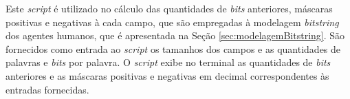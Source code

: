 Este \textit{script} é utilizado no cálculo das quantidades de \textit{bits} anteriores, máscaras positivas e negativas à cada campo, que são empregadas à modelagem \textit{bitstring} dos agentes humanos, que é apresentada na Seção \ref{sec:modelagemBitstring}. São fornecidos como entrada ao \textit{script} os tamanhos dos campos e as quantidades de palavras e \textit{bits} por palavra. O \textit{script} exibe no terminal as quantidades de \textit{bits} anteriores e as máscaras positivas e negativas em decimal correspondentes às entradas fornecidas. 



\newpage
